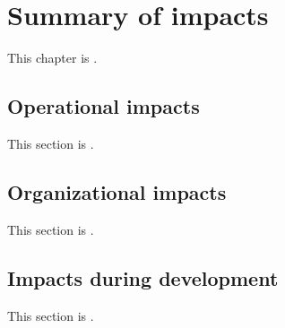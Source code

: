 
\chapter{Summary of impacts}
\label{loc:Summary of impacts}


This chapter is \TBD.


\section{Operational impacts}
\label{loc:Operational impacts}


This section is \TBD.


\section{Organizational impacts}
\label{loc:Organizational impacts}


This section is \TBD.


\section{Impacts during development}
\label{loc:Impacts during development}


This section is \TBD.
